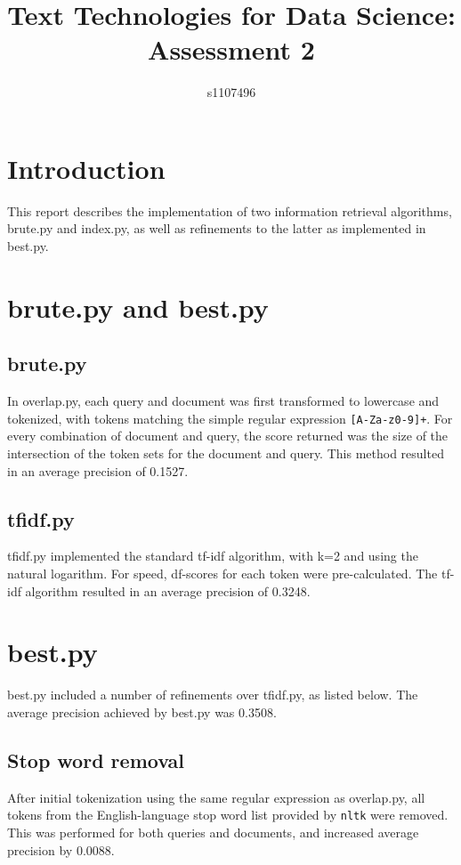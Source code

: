 \documentclass{article}
\begin{document}
\title{Text Technologies for Data Science: Assessment 2}
\author{s1107496}

\maketitle

\section{Introduction}
This report describes the implementation of two information retrieval algorithms, brute.py and index.py, as well as refinements to the latter as implemented in best.py.

\section{brute.py and best.py}
\subsection{brute.py}
In overlap.py, each query and document was first transformed to lowercase and tokenized, with tokens matching the simple regular expression \texttt{[A-Za-z0-9]+}. For every combination of document and query, the score returned was the size of the intersection of the token sets for the document and query. This method resulted in an average precision of 0.1527.
\subsection{tfidf.py}
tfidf.py implemented the standard tf-idf algorithm, with k=2 and using the natural logarithm. For speed, df-scores for each token were pre-calculated. The tf-idf algorithm resulted in an average precision of 0.3248.

\section{best.py}
best.py included a number of refinements over tfidf.py, as listed below. The average precision achieved by best.py was 0.3508.
\subsection{Stop word removal}
After initial tokenization using the same regular expression as overlap.py, all tokens from the English-language stop word list provided by \texttt{nltk} were removed. This was performed for both queries and documents, and increased average precision by 0.0088.
\end{document}

